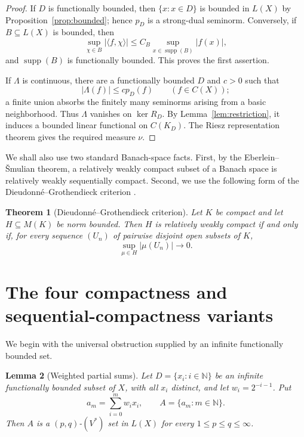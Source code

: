 \documentclass[11pt]{article}
\newtheorem{theorem}{Theorem}[section]
\newtheorem{lemma}[theorem]{Lemma}
\newcommand{\N}{\mathbb N}
\newcommand{\supp}{\operatorname{supp}}
\begin{document}
\begin{proof}
If $D$ is functionally bounded, then $\{x:x\in D\}$ is bounded in $L(X)$ by
Proposition~\ref{prop:bounded}; hence $p_D$ is a strong-dual seminorm.
Conversely, if $B\subseteq L(X)$ is bounded, then
\[
  \sup_{\chi\in B}|\langle f,\chi\rangle|
  \leq C_B\sup_{x\in\supp(B)}|f(x)|,
\]
and $\supp(B)$ is functionally bounded.  This proves the first assertion.

If $\Lambda$ is continuous, there are a functionally bounded $D$ and $c>0$
such that
\[
  |\Lambda(f)|\leq c p_D(f)
  \qquad(f\in C(X));
\]
a finite union absorbs the finitely many seminorms arising from a basic
neighborhood.  Thus $\Lambda$ vanishes on $\ker R_D$.  By
Lemma~\ref{lem:restriction}, it induces a bounded linear functional on
$C(K_D)$.  The Riesz representation theorem gives the required measure $\nu$.
\end{proof}

We shall also use two standard Banach-space facts.  First, by the
Eberlein--\v Smulian theorem, a relatively weakly compact subset of a Banach
space is relatively weakly sequentially compact.  Second, we use the following
form of the Dieudonn\'e--Grothendieck criterion
\cite{Wells1969}.

\begin{theorem}[Dieudonn\'e--Grothendieck criterion]\label{thm:DG}
Let $K$ be compact and let $H\subseteq M(K)$ be norm bounded.  Then $H$ is
relatively weakly compact if and only if, for every sequence $(U_n)$ of pairwise
disjoint open subsets of $K$,
\[
  \sup_{\mu\in H}|\mu(U_n)|\longrightarrow0.
\]
\end{theorem}

\section{The four compactness and sequential-compactness variants}

We begin with the universal obstruction supplied by an infinite functionally
bounded set.

\begin{lemma}[Weighted partial sums]\label{lem:weighted-v}
Let $D=\{x_i:i\in\N\}$ be an infinite functionally bounded subset of $X$, with
all $x_i$ distinct, and let $w_i=2^{-i-1}$.  Put
\[
  a_m=\sum_{i=0}^m w_i x_i,
  \qquad
  A=\{a_m:m\in\N\}.
\]
Then $A$ is a $(p,q)$-$(V^*)$ set in $L(X)$ for every
$1\leq p\leq q\leq\infty$.
\end{lemma}
\end{document}
